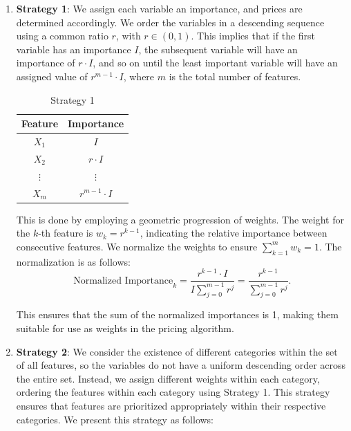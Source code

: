 \documentclass[12pt]{book}
\begin{document}
\begin{enumerate}
    \item \textbf{Strategy 1}: We assign each variable an importance, and prices are determined accordingly. We order the variables in a descending sequence using a common ratio $r$, with $r \in (0,1)$. This implies that if the first variable has an importance $I$, the subsequent variable will have an importance of $r \cdot I$, and so on until the least important variable will have an assigned value of $r^{m-1} \cdot I$, where $m$ is the total number of features.
    
        \begin{table}[H]
        \centering
        \begin{tabular}{@{}cc@{}}
        \toprule
        \textbf{Feature} & \textbf{Importance} \\ \midrule
        $X_1$            & $I$                 \\
        $X_2$            & $r \cdot I$         \\
        $\vdots$         & $\vdots$            \\
        $X_m$            & $r^{m-1} \cdot I$   \\ \bottomrule
        \end{tabular}%
        \caption{Strategy 1}
        \label{strategyone}
        \end{table}
        
        This is done by employing a geometric progression of weights. The weight for the $k$-th feature is $w_k = r^{k-1}$, indicating the relative importance between consecutive features. We normalize the weights to ensure $\sum_{k=1}^{m} w_k = 1$. The normalization is as follows:
        \[
        \text{Normalized Importance}_k = \frac{r^{k-1} \cdot I}{I \sum_{j=0}^{m-1} r^j} = \frac{r^{k-1}}{\sum_{j=0}^{m-1} r^j}.
        \]

    
        This ensures that the sum of the normalized importances is 1, making them suitable for use as weights in the pricing algorithm.

    
    \item \textbf{Strategy 2}: We consider the existence of different categories within the set of all features, so the variables do not have a uniform descending order across the entire set. Instead, we assign different weights within each category, ordering the features within each category using Strategy 1. This strategy ensures that features are prioritized appropriately within their respective categories. We present this strategy as follows:



\end{enumerate}
\end{document}
